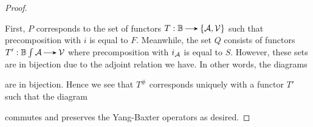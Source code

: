 \begin{proof}
    \begin{center}
    \end{center}
    First, $P$ corresponds to the set of functors $T: \mathbb{B} \to \{\aa, \vv\}$ such that precomposition with $i$ is equal to $F$. Meanwhile, the set $Q$ consists of functors $T': \mathbb{B}\int\aa \to \vv$ where precomposition with $i_{\aa}$ is equal to $S$. However, these sets are in bijection due to the adjoint relation we have. In other words, the diagrams 
    \begin{center}
    \end{center}
    are in bijection. Hence we see that $T^{\#}$
    corresponds uniquely with a functor $T'$ such that 
    the diagram 
    \begin{center}
    \end{center}
    commutes and preserves the Yang-Baxter operators as desired. 
\end{proof}

